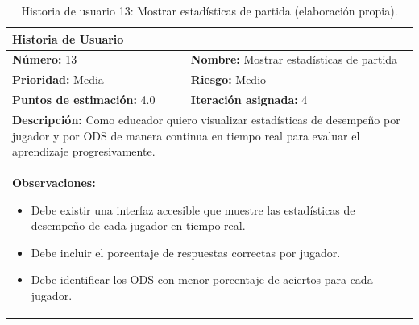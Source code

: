 \begin{table}[H]
\centering
\caption{Historia de usuario 13: Mostrar estadísticas de partida (elaboración propia).\label{tab:hu13}}
\renewcommand{\arraystretch}{1.5}
\begin{tabular}{|p{}|p{}|}
\hline
\multicolumn{2}{|l|}{\textbf{Historia de Usuario}} \\
\hline
\textbf{Número:} 13 & \textbf{Nombre:} Mostrar estadísticas de partida \\
\hline
\textbf{Prioridad:} Media & \textbf{Riesgo:} Medio \\
\hline
\textbf{Puntos de estimación:} 4.0 & \textbf{Iteración asignada:} 4 \\
\hline
\multicolumn{2}{|p{0.945\textwidth}|}{\textbf{Descripción:} Como educador quiero visualizar estadísticas de desempeño por jugador y por ODS de manera continua en tiempo real para evaluar el aprendizaje progresivamente.} \\
\hline
\multicolumn{2}{|p{0.945\textwidth}|}{\textbf{Observaciones:}
\vspace{-0.5em}
\begin{itemize}
    \setlength\itemsep{0em}
    \item Debe existir una interfaz accesible que muestre las estadísticas de desempeño de cada jugador en tiempo real.
    \item Debe incluir el porcentaje de respuestas correctas por jugador.
    \item Debe identificar los ODS con menor porcentaje de aciertos para cada jugador.
\end{itemize}
\vspace{-1em}
} \\
\hline
\end{tabular}
\end{table}

